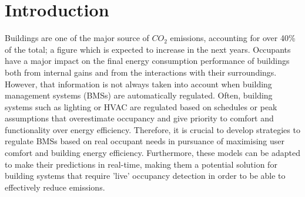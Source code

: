 \documentclass[conference]{IEEEtran}
\begin{document}
\section{Introduction}
Buildings are one of the major source of $CO_2$ emissions, accounting for over 40\% of the total; a figure which is expected to increase in the next years\cite{Nejat2015}. Occupants have a major impact on the final energy consumption performance of buildings both from internal gains and from the interactions with their surroundings. However, that information is not always taken into account when building management systems (BMSs) are automatically regulated. Often, building systems such as lighting or HVAC are regulated based on schedules or peak assumptions that overestimate occupancy and give priority to comfort and functionality over energy efficiency\cite{Azar2012}. Therefore, it is crucial to develop strategies to regulate BMSs based on real occupant needs in pursuance of maximising user comfort and building energy efficiency. Furthermore, these models can be adapted to make their predictions in real-time, making them a potential solution for building systems that require 'live' occupancy detection in order to be able to effectively reduce emissions. %
\end{document}
